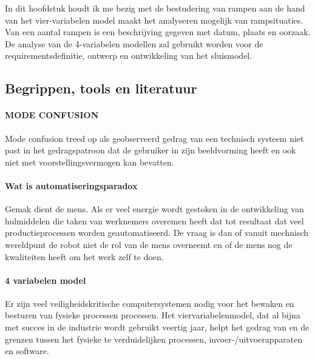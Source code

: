 \documentclass{article}
\begin{document}
	
	In dit hoofdstuk houdt ik me bezig met de bestudering van rampen aan de hand van het vier-variabelen model  maakt het analyseren mogelijk van rampsituaties. Van een aantal rampen is een beschrijving gegeven met datum, plaats en oorzaak. De analyse van de 4-variabelen modellen zal gebruikt worden voor de requirementsdefinitie, ontwerp en ontwikkeling van het sluismodel. 
	
	
	
	\subsection{Begrippen, tools en literatuur}
	

	
	\paragraph{MODE CONFUSION }
	Mode confusion treed op als geobserveerd gedrag van een technisch systeem niet past in het gedragspatroon dat de gebruiker in zijn beeldvorming heeft  en ook niet met voorstellingsvermogen kan bevatten.
	
	\paragraph{Wat is automatiseringsparadox}
	Gemak dient de mens. Als er veel energie wordt gestoken in de ontwikkeling van hulmiddelen die taken van werknemers overemen heeft dat tot resultaat dat veel productieprocessen worden geautomatiseerd. De vraag is dan of vanuit mechnisch wereldpunt de robot niet de rol van de mens overneemt en of de mens nog de kwaliteiten heeft om het werk zelf te doen.
	
	
	
	\paragraph{4 variabelen model}
	
	Er zijn veel veiligheidskritische computersystemen nodig voor het bewaken en besturen van fysieke processen
	processen. Het viervariabelenmodel, dat al bijna met succes in de industrie wordt gebruikt
	veertig jaar, helpt het gedrag van en de grenzen tussen het fysieke te verduidelijken
	processen, invoer-/uitvoerapparaten en software. \cite{ImplementabilityOf4VarSCP2015}
	
	
	
\end{document}
